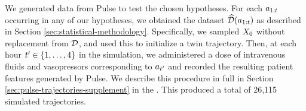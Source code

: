 


We generated data from Pulse to test the chosen hypotheses.
For each $a_{1:t}$ occurring in any of our hypotheses, we obtained the dataset $\widehat{\mathcal{D}}(a_{1:t})$ as described in Section \ref{sec:statistical-methodology}.
Specifically, we sampled $X_0$ without replacement from $\mathcal{D}$, and used this to initialize a twin trajectory.
Then, at each hour $t' \in \{1, \ldots, 4\}$ in the simulation, we administered a dose of intravenous fluids and vasopressors corresponding to $a_{t'}$ and recorded the resulting patient features generated by Pulse. 
We describe this procedure in full in Section \ref{sec:pulse-trajectories-supplement} in the \AppendixName.
This produced a total of 26,115 simulated trajectories.

